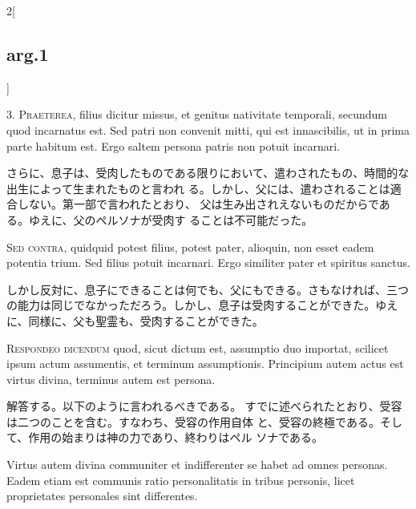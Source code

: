 \documentclass[paper=a4paper,fontsize=10pt,jafontsize=9pt,titlepage]{jlreq}
\begin{document}
\begin{paracol}{2}[\subsection{arg.1}]

3. {\scshape Praeterea}, filius dicitur missus, et genitus nativitate temporali,
secundum quod incarnatus est. Sed patri non convenit mitti, qui est
innascibilis, ut in prima parte habitum est. Ergo saltem persona patris
non potuit incarnari.

\switchcolumn

さらに、息子は、受肉したものである限りにおいて、遣わされたもの、時間的な出生によって生まれたものと言われ
 る。しかし、父には、遣わされることは適合しない。第一部で言われたとおり、
 父は生み出されえないものだからである。ゆえに、父のペルソナが受肉す
 ることは不可能だった。

\switchcolumn*[\subsection{s.c.}]

{\scshape Sed contra}, quidquid potest filius, potest pater, alioquin, non esset
eadem potentia trium. Sed filius potuit incarnari. Ergo similiter pater
et spiritus sanctus.

\switchcolumn

しかし反対に、息子にできることは何でも、父にもできる。さもなければ、三つ
 の能力は同じでなかっただろう。しかし、息子は受肉することができた。ゆえ
 に、同様に、父も聖霊も、受肉することができた。


{\scshape Respondeo dicendum} quod, sicut dictum est, assumptio duo importat,
scilicet ipsum actum assumentis, et terminum assumptionis. Principium
autem actus est virtus divina, terminus autem est persona.

\switchcolumn

解答する。以下のように言われるべきである。
すでに述べられたとおり、受容は二つのことを含む。すなわち、受容の作用自体
 と、受容の終極である。そして、作用の始まりは神の力であり、終わりはペル
 ソナである。

\switchcolumn*

Virtus autem
divina communiter et indifferenter se habet ad omnes personas. Eadem
etiam est communis ratio personalitatis in tribus personis, licet
proprietates personales sint differentes.


\end{paracol}
\end{document}
